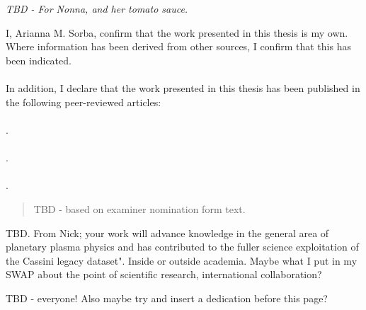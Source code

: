 \maketitle

\chapter*{}
\begin{center}
\textit{TBD - For Nonna, and her tomato sauce.}
\end{center}

\begin{declaration}
I, Arianna M. Sorba, confirm that the work presented in this thesis is my own.
Where information has been derived from other sources, I confirm that this has been indicated.
\\
\\
In addition, I declare that the work presented in this thesis has been published in the following peer-reviewed articles:
\\
\\
.
\\
\\
.
\\
\\
.

\end{declaration}

\begin{abstract} %
TBD - based on examiner nomination form text.
\blindtext
\end{abstract}

\begin{impactstatement} %
TBD. From Nick;  your work will advance knowledge in the general area of planetary plasma physics and has contributed to the fuller science exploitation of the Cassini legacy dataset".
Inside or outside academia. Maybe what I put in my SWAP about the point of scientific research, international collaboration?
\blindtext 
\end{impactstatement}


\begin{acknowledgements}
TBD - everyone! Also maybe try and insert a dedication before this page?
\blindtext
\end{acknowledgements}

